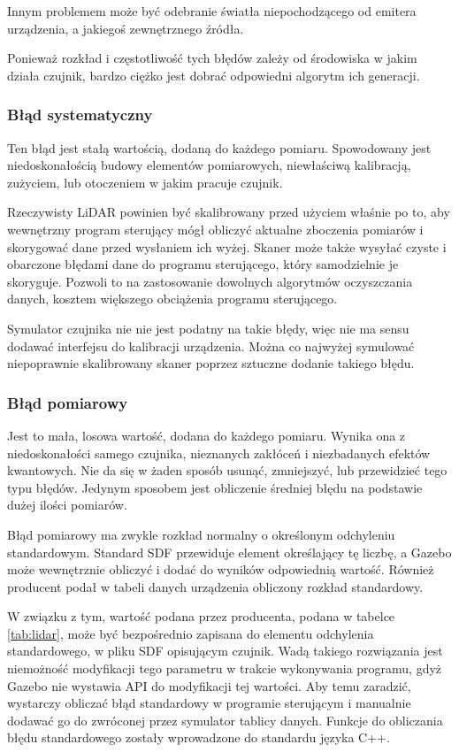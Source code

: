 			Innym problemem może być odebranie światła niepochodzącego od emitera urządzenia, a jakiegoś zewnętrznego źródła.

			Ponieważ rozkład i częstotliwość tych błędów zależy od środowiska w jakim działa czujnik, bardzo ciężko jest dobrać odpowiedni algorytm ich generacji.

		\subsubsection{Błąd systematyczny}
			Ten błąd jest stałą wartością, dodaną do każdego pomiaru.
			Spowodowany jest niedoskonałością budowy elementów pomiarowych, niewłaściwą kalibracją, zużyciem, lub otoczeniem w jakim pracuje czujnik.

			Rzeczywisty LiDAR powinien być skalibrowany przed użyciem właśnie po to, aby wewnętrzny program sterujący mógł obliczyć aktualne zboczenia pomiarów
			i skorygować dane przed wysłaniem ich wyżej.
			Skaner może także wysyłać czyste i obarczone błędami dane do programu sterującego, który samodzielnie je skoryguje.
			Pozwoli to na zastosowanie dowolnych algorytmów oczyszczania danych, kosztem większego obciążenia programu sterującego.

			Symulator czujnika nie nie jest podatny na takie błędy, więc nie ma sensu dodawać interfejsu do kalibracji urządzenia.
			Można co najwyżej symulować niepoprawnie skalibrowany skaner poprzez sztuczne dodanie takiego błędu.

		\subsubsection{Błąd pomiarowy}
			Jest to mała, losowa wartość, dodana do każdego pomiaru.
			Wynika ona z niedoskonałości samego czujnika, nieznanych zakłóceń i niezbadanych efektów kwantowych.
			Nie da się w żaden sposób usunąć, zmniejszyć, lub przewidzieć tego typu błędów.
			Jedynym sposobem jest obliczenie średniej błędu na podstawie dużej ilości pomiarów.

			Błąd pomiarowy ma zwykle rozkład normalny o określonym odchyleniu standardowym.
			Standard SDF przewiduje element określający tę liczbę, a Gazebo może wewnętrznie obliczyć i dodać do wyników odpowiednią wartość.
			Również producent podał w tabeli danych urządzenia obliczony rozkład standardowy.

			W związku z tym, wartość podana przez producenta, podana w tabelce \ref{tab:lidar}, może być bezpośrednio zapisana do 
			elementu odchylenia standardowego, w pliku SDF opisującym czujnik.
			Wadą takiego rozwiązania jest niemożność modyfikacji tego parametru w trakcie wykonywania programu, gdyż Gazebo nie wystawia API do modyfikacji tej wartości.
			Aby temu zaradzić, wystarczy obliczać błąd standardowy w programie sterującym i manualnie dodawać go do zwróconej przez symulator tablicy danych.
			Funkcje do obliczania błędu standardowego zostały wprowadzone do standardu języka C++.
			
